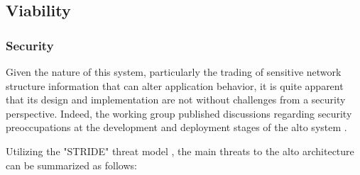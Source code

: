 \subsection{Viability}

\subsubsection{Security}
\label{ssec:alto-security}

    Given the nature of this system, particularly the trading of sensitive network structure information that can alter application behavior, it is quite apparent that its design and implementation are not without challenges from a security perspective.
    Indeed, the working group published discussions regarding security preoccupations at the development and deployment stages of the \gls{alto} system \cite{alto-problem-statement} \cite{alto-protocol} \cite{alto-deployment-considerations}.

    Utilizing the "STRIDE" threat model \cite{stride}, the main threats to the \gls{alto} architecture can be summarized as follows:

